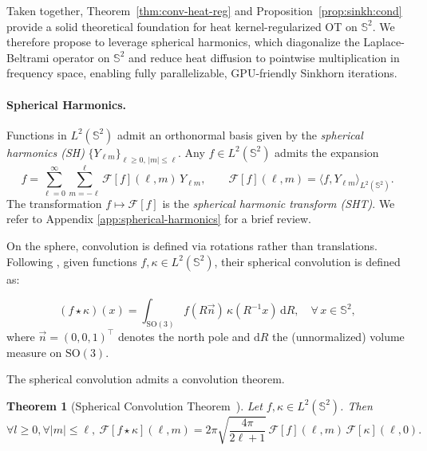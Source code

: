 \documentclass{article}
\theoremstyle{plain}
\newtheorem{theorem}{Theorem}[section]
\theoremstyle{definition}
\theoremstyle{remark}
\renewcommand{\S}{\ensuremath{\mathbb{S}}}
\begin{document}
Taken together, Theorem~\ref{thm:conv-heat-reg} and Proposition~\ref{prop:sinkh:cond}
provide a solid theoretical foundation for heat kernel-regularized OT on $\S^2$.
We therefore propose to leverage spherical harmonics, which diagonalize the
Laplace-Beltrami operator on $\S^2$ and reduce heat diffusion to pointwise
multiplication in frequency space, enabling fully parallelizable, GPU-friendly
Sinkhorn iterations.

\paragraph{Spherical Harmonics.}

Functions in \(L^2(\S^2)\) admit an orthonormal basis given by the \emph{spherical harmonics (SH)} \(\{Y_{\ell m}\}_{\ell \ge 0,\, |m| \le \ell}\). Any \(f \in L^2(\S^2)\) admits the expansion
\[
f = \sum_{\ell=0}^{\infty} \sum_{m=-\ell}^{\ell} \mathcal{F}[f](\ell, m)\, Y_{\ell m},
\qquad
\mathcal{F}[f](\ell, m) = \langle f, Y_{\ell m} \rangle_{L^2(\S^2)}.
\]
The transformation \(f \mapsto \mathcal{F}[f]\) is the \emph{spherical harmonic transform (SHT)}. We refer to Appendix \ref{app:spherical-harmonics} for a brief review.

On the sphere, convolution is defined via rotations rather than translations. Following \cite{driscoll1994computing}, given functions $f, \kappa \in L^2(\S^2)$, their spherical convolution is defined as: 

\begin{equation}
    (f \star \kappa)(x)
    = \int_{\mathrm{SO}(3)} f(R\vec{n}) \, \kappa(R^{-1}x) \, \mathrm{d}R,
    \quad \forall\, x \in \S^2,
    \label{eq:spherical-conv}
\end{equation}
where $\vec{n} = (0,0,1)^\top$ denotes the north pole and $\mathrm{d}R$ the (unnormalized) volume measure on $\mathrm{SO}(3)$. 

The spherical convolution admits a convolution theorem.

\begin{theorem}[Spherical Convolution Theorem~\cite{driscoll1994computing}]\label{thm:spherical-conv-theorem}
Let $f, \kappa \in L^2(\S^2)$.
Then
\begin{equation}
\forall l \geq 0, \forall |m| \le \ell, ~	\mathcal{F}[f \star \kappa](\ell,m)
	= 2\pi \sqrt{\frac{4\pi}{2\ell+1}}
	\, \mathcal{F}[f](\ell,m)
	\, \mathcal{F}[\kappa](\ell,0).
	\label{eq:spherical-conv-theorem}
\end{equation}
\end{theorem}
\end{document}
